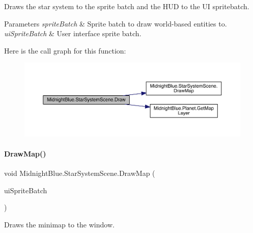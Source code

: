 Draws the star system to the sprite batch and the H\+UD to the UI spritebatch. 


\begin{DoxyParams}{Parameters}
{\em sprite\+Batch} & Sprite batch to draw world-\/based entities to.\\
\hline
{\em ui\+Sprite\+Batch} & User interface sprite batch.\\
\hline
\end{DoxyParams}
Here is the call graph for this function\+:\nopagebreak
\begin{figure}[H]
\begin{center}
\leavevmode
\includegraphics[width=350pt]{class_midnight_blue_1_1_star_system_scene_ac3d90fb8d914d15b912f5da3cc1aa8a0_cgraph}
\end{center}
\end{figure}
\hypertarget{class_midnight_blue_1_1_star_system_scene_a8ce5e552f65d43e0326644e069dc6c24}{}\label{class_midnight_blue_1_1_star_system_scene_a8ce5e552f65d43e0326644e069dc6c24} 
\paragraph{\texorpdfstring{Draw\+Map()}{DrawMap()}}
{\footnotesize\ttfamily void Midnight\+Blue.\+Star\+System\+Scene.\+Draw\+Map (\begin{DoxyParamCaption}\item[{Sprite\+Batch}]{ui\+Sprite\+Batch }\end{DoxyParamCaption})\hspace{0.3cm}{\ttfamily [inline]}}



Draws the minimap to the window. 


